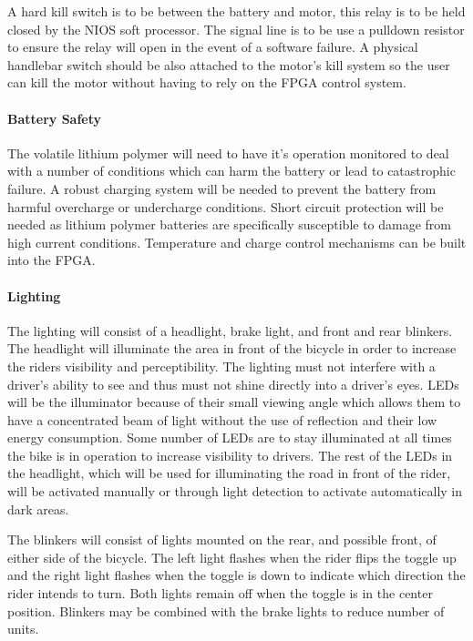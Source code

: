 \documentclass[12pt,article]{IEEEtran}
\begin{document}
        	A hard kill switch is to be between the battery and motor, this relay is to be held closed by the NIOS 
        	soft processor. The signal line is to be use a pulldown resistor to ensure the relay will open in the 
        	event of a software failure. A physical handlebar switch should be also attached to the motor's kill 
        	system so the user can kill the motor without having to rely on the FPGA control system.
        
        \paragraph{Battery Safety}
        	The volatile lithium polymer will need to have it's operation monitored to deal with a
        	number of conditions which can harm the battery or lead to catastrophic failure. A robust
			charging system will be needed to prevent the battery from harmful overcharge or undercharge
			conditions. Short circuit protection will be needed as lithium polymer batteries are specifically
			susceptible to damage from high current conditions. Temperature and charge control mechanisms
			can be built into the FPGA. 

        \paragraph{Lighting}
        	The lighting will consist of a headlight, brake light, and front and rear blinkers. The 
        	headlight will illuminate the area in front of the bicycle in order to increase the riders 
        	visibility and perceptibility.  The lighting must not interfere with a driver's ability to 
        	see and thus must not shine directly into a driver's eyes.  LEDs will be the illuminator 
        	because of their small viewing angle which allows them to have a concentrated beam of light 
        	without the use of reflection and their low energy consumption.  Some number of LEDs are to
        	stay illuminated at all times the bike is in operation to increase visibility to drivers.  
        	The rest of the LEDs in the headlight, which will be used for  illuminating the road in 
        	front of the rider, will be activated manually or through light detection to activate 
        	automatically in dark areas.
        
        	The blinkers will consist of lights mounted on the rear, and possible front, of either side of 
        	the bicycle.  The left light flashes when the rider flips the toggle up and the right light 
        	flashes when the toggle is down to indicate which direction the rider intends to turn.  Both 
        	lights remain off when the toggle is in the center position.  Blinkers may be combined with the 
        	brake lights to reduce number of  units.
        	
\end{document}
